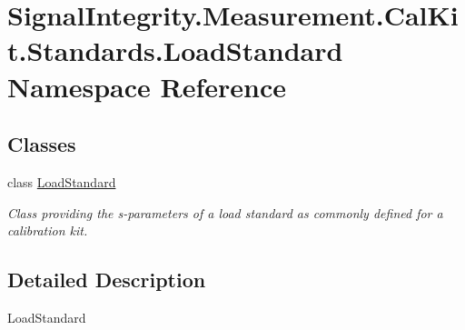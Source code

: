 \hypertarget{namespaceSignalIntegrity_1_1Measurement_1_1CalKit_1_1Standards_1_1LoadStandard}{}\section{Signal\+Integrity.\+Measurement.\+Cal\+Kit.\+Standards.\+Load\+Standard Namespace Reference}
\label{namespaceSignalIntegrity_1_1Measurement_1_1CalKit_1_1Standards_1_1LoadStandard}
\subsection*{Classes}
\begin{DoxyCompactItemize}
\item 
class \hyperlink{classSignalIntegrity_1_1Measurement_1_1CalKit_1_1Standards_1_1LoadStandard_1_1LoadStandard}{Load\+Standard}
\begin{DoxyCompactList}\small\item\em Class providing the s-\/parameters of a load standard as commonly defined for a calibration kit. \end{DoxyCompactList}\end{DoxyCompactItemize}


\subsection{Detailed Description}
\begin{DoxyVerb}LoadStandard\end{DoxyVerb}
 